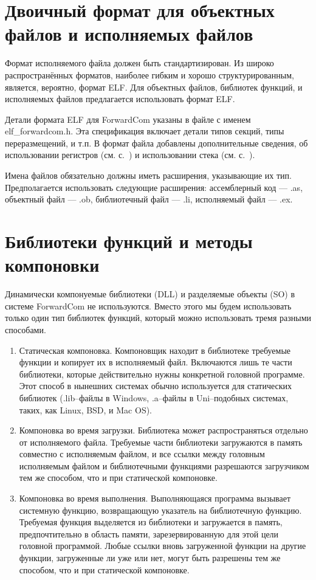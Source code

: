 \documentclass[forwardcom.tex]{subfiles}
\begin{document}
\section{Двоичный формат для объектных файлов и исполняемых файлов} \label{objectFileFormat}
Формат исполняемого файла должен быть стандартизирован. Из широко распространённых форматов, наиболее гибким и хорошо структурированным, является, вероятно, формат ELF. Для объектных файлов, библиотек функций, и исполняемых файлов предлагается использовать формат ELF. 

Детали формата ELF для ForwardCom указаны в файле с именем elf\_forwardcom.h. Эта спецификация включает детали типов секций, типы переразмещений, и т.п. В формат файла добавлены дополнительные сведения, об использовании регистров (см. с.~\pageref{registerUsageConvention}) и использовании стека (см. с.~\pageref{predictingStackSize}). 

Имена файлов обязательно должны иметь расширения, указывающие их тип. Предполагается использовать следующие расширения: ассемблерный код ---  .as, объектный файл ---  .ob, библиотечный файл ---  .li, исполняемый файл --- .ex. 

\section{Библиотеки функций и методы компоновки} \label{libraryLinkMethods}
Динамически компонуемые библиотеки (DLL) и разделяемые объекты (SO) в системе ForwardCom не используются. Вместо этого мы будем использовать только один тип библиотек функций, который можно использовать тремя разными способами.
\begin{enumerate}
\item Статическая компоновка. \label{staticLinking} Компоновщик находит в библиотеке требуемые функции и копирует их в исполняемый файл. Включаются лишь те части библиотеки, которые действительно нужны конкретной головной программе. Этот способ в нынешних системах обычно используется для статических библиотек (.lib--файлы в Windows, .a--файлы в Uni--подобных системах, таких, как Linux, BSD, и Mac OS).

\item Компоновка во время загрузки. \label{loadTimeLinking} Библиотека может распространяться отдельно от исполняемого файла. Требуемые части библиотеки загружаются в память совместно с исполняемым файлом, и все ссылки между головным исполняемым файлом и библиотечными функциями разрешаются загрузчиком тем же способом, что и при статической компоновке.

\item Компоновка во время выполнения. \label{runtimeLinking} Выполняющаяся программа вызывает системную функцию, возвращающую указатель на библиотечную функцию. Требуемая функция выделяется из библиотеки и загружается в память, предпочтительно в область памяти, зарезервированную для этой цели головной программой. Любые ссылки вновь загруженной функции на другие функции, загруженные ли уже или нет, могут быть разрешены тем же способом, что и при статической компоновке.
\end{enumerate}
\end{document}
